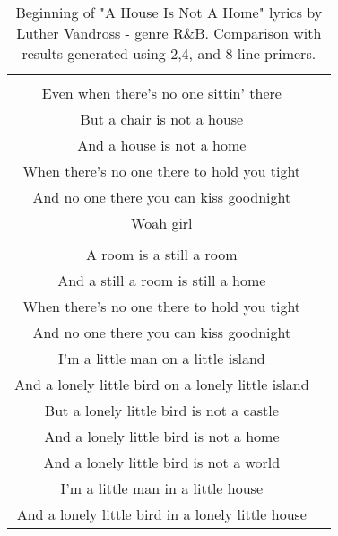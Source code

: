 \begin{table}
\begin{tabular}{cc}
\begin{minipage}[t]{0.47\textwidth}
	 \end{minipage}
	 & 
	 \begin{minipage}[t]{0.47\textwidth}
	 A chair is still a chair\\
	 Even when there's no one sittin' there\\
	 But a chair is not a house\\
	 And a house is not a home\\
	 When there's no one there to hold you tight\\
	 And no one there you can kiss goodnight\\
	 Woah girl\\
	 \\
	 A room is a still a room\\
	 \color{blue} And a still a room is still a home\\
	 When there's no one there to hold you tight\\
	 And no one there you can kiss goodnight\\
	 I'm a little man on a little island\\
	 And a lonely little bird on a lonely little island\\	 
	 But a lonely little bird is not a castle\\
	 And a lonely little bird is not a home\\
	 And a lonely little bird is not a world\\
	 I'm a little man in a little house\\
	 And a lonely little bird in a lonely little house
	 \end{minipage}\\[6pt]
	\end{tabular}
	\caption{Beginning of "A House Is Not A Home" lyrics by Luther Vandross - genre R\&B. Comparison with results generated using 2,4, and 8-line primers.}
\end{table}



